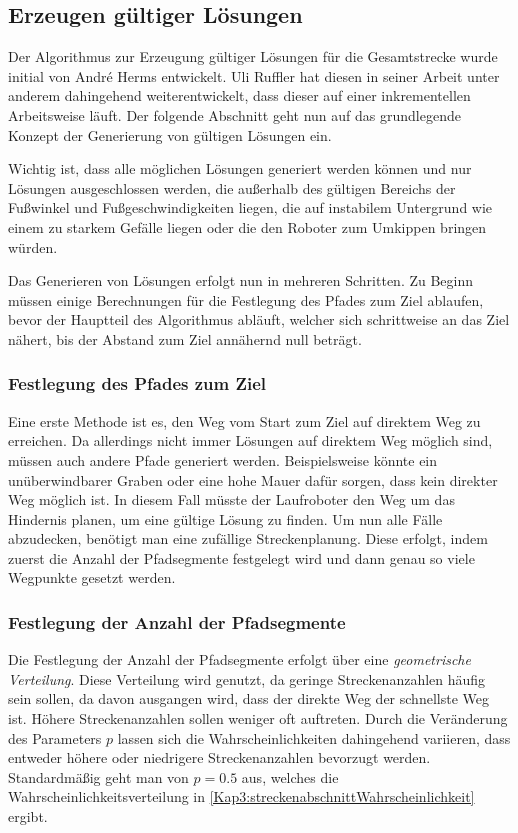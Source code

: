 \subsection{Erzeugen gültiger Lösungen}

Der Algorithmus zur Erzeugung gültiger Lösungen für die Gesamtstrecke wurde initial von André Herms \autocite{herms2004} entwickelt. Uli Ruffler \autocite{ruffler2006} hat diesen in seiner Arbeit unter anderem dahingehend weiterentwickelt, dass dieser auf einer inkrementellen Arbeitsweise läuft. Der folgende Abschnitt geht nun auf das grundlegende Konzept der Generierung von gültigen Lösungen ein.

Wichtig ist, dass alle möglichen Lösungen generiert werden können und nur Lösungen ausgeschlossen werden, die außerhalb des gültigen Bereichs der Fußwinkel und Fußgeschwindigkeiten liegen, die auf instabilem Untergrund wie einem zu starkem Gefälle liegen oder die den Roboter zum Umkippen bringen würden.

Das Generieren von Lösungen erfolgt nun in mehreren Schritten. Zu Beginn müssen einige Berechnungen für die Festlegung des Pfades zum Ziel ablaufen, bevor der Hauptteil des Algorithmus abläuft, welcher sich schrittweise an das Ziel nähert, bis der Abstand zum Ziel annähernd null beträgt.

\subsubsection{Festlegung des Pfades zum Ziel}

Eine erste Methode ist es, den Weg vom Start zum Ziel auf direktem Weg zu erreichen. Da allerdings nicht immer Lösungen auf direktem Weg möglich sind, müssen auch andere Pfade generiert werden. Beispielsweise könnte ein unüberwindbarer Graben oder eine hohe Mauer dafür sorgen, dass kein direkter Weg möglich ist. In diesem Fall müsste der Laufroboter den Weg um das Hindernis planen, um eine gültige Lösung zu finden. Um nun alle Fälle abzudecken, benötigt man eine zufällige Streckenplanung. Diese erfolgt, indem zuerst die Anzahl der Pfadsegmente festgelegt wird und dann genau so viele Wegpunkte gesetzt werden.

\subsubsection{Festlegung der Anzahl der Pfadsegmente}

Die Festlegung der Anzahl der Pfadsegmente erfolgt über eine \emph{geometrische Verteilung}. Diese Verteilung wird genutzt, da geringe Streckenanzahlen häufig sein sollen, da davon ausgangen wird, dass der direkte Weg der schnellste Weg ist. Höhere Streckenanzahlen sollen weniger oft auftreten. Durch die Veränderung des Parameters $p$ lassen sich die Wahrscheinlichkeiten dahingehend variieren, dass entweder höhere oder niedrigere Streckenanzahlen bevorzugt werden. Standardmäßig geht man von $p = 0.5$ aus, welches die Wahrscheinlichkeitsverteilung in \autoref{Kap3:streckenabschnittWahrscheinlichkeit} ergibt.

